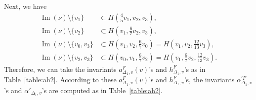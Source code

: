 Next, we have 
\begin{align*}
\operatorname{Im}(\nu) \setminus \{ v_1 \} &\subset H \left( \frac{4}{5} v_1 , v_2, v_3 \right), \\
\operatorname{Im}(\nu) \setminus \{ v_2 \} &\subset H \left( v_1 , \frac{6}{7} v_2, v_3 \right), \\
\operatorname{Im}(\nu) \setminus \{ v_0, v_3 \} &\subset H \left( v_1 , v_2, \frac{6}{7}v_0 \right) = H \left( v_1 , v_2, \frac{12}{13} v_3 \right), \\
\operatorname{Im}(\nu) \setminus \{ v_2, v_3 \} &\subset H \left( v_0 , v_1, \frac{6}{7}v_2 \right) = H \left( v_1 , \frac{6}{7} v_2, \frac{12}{13} v_3 \right). 
\end{align*}
Therefore, we can take the invariants $a_{\Delta _1, v}^F (v)$'s and $h_{\Delta _1, v}^F$'s as in Table~\ref{table:ah2}. 
According to these $a_{\Delta _1, v}^F (v)$'s and $h_{\Delta _1, v}^F$'s, 
the invariants $\alpha^{\prime F} _{\Delta _1, v}$'s and $\alpha' _{\Delta _1, v}$'s are computed as in Table~\ref{table:ah2}. 
